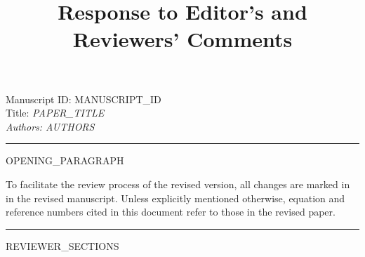 \documentclass[journal, onecolumn,12pt, draftclsnofoot]{IEEEtran}
\def\bl#1{\color{blue}{#1}\color{black}}
\begin{document}
\title{{\LARGE\bfseries Response to Editor's and Reviewers' Comments}}
\date{}
\maketitle \fussy


\vspace{-2cm}

\large
Manuscript ID: {{MANUSCRIPT_ID}}  \\
Title: \normalsize\em {{PAPER_TITLE}} \em \large\\
Authors: {{AUTHORS}}\\

\vspace*{5mm} \hrule \vspace*{5mm}

\normalsize

{{OPENING_PARAGRAPH}}

To facilitate the review process of the revised version, all changes are marked in {\bl {blue}} in the revised manuscript. Unless explicitly mentioned otherwise, equation and reference numbers cited in this document refer to those in the revised paper.
\vspace*{6mm}\hrule


\clearpage

{{REVIEWER_SECTIONS}}
\end{document}
